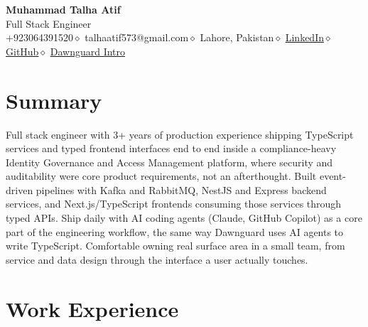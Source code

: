 \documentclass[10pt, letterpaper]{article}
\begin{document}
\pagestyle{empty}

\begin{center}
  {\Large\bfseries\color{navy} Muhammad Talha Atif}\\[4pt]
  {\normalsize\color{medgray} Full Stack Engineer}\\[4pt]
  {\small\color{lightgray}
    +923064391520\enspace$\diamond$\enspace
    talhaatif573@gmail.com\enspace$\diamond$\enspace
    Lahore, Pakistan\enspace$\diamond$\enspace
    \href{https://linkedin.com/in/muhammad-talha-atif}{LinkedIn}\enspace$\diamond$\enspace
    \href{https://github.com/M-Talha-Atif}{GitHub}\enspace$\diamond$\enspace
    \href{https://talha-atif.vercel.app/r/dawnguard}{Dawnguard Intro}}
\end{center}

\vspace{2pt}

\section{Summary}

Full stack engineer with 3+ years of production experience shipping TypeScript services and
typed frontend interfaces end to end inside a compliance-heavy Identity Governance and Access
Management platform, where security and auditability were core product requirements, not an
afterthought. Built event-driven pipelines with Kafka and RabbitMQ, NestJS and Express backend
services, and Next.js/TypeScript frontends consuming those services through typed APIs. Ship
daily with AI coding agents (Claude, GitHub Copilot) as a core part of the engineering workflow,
the same way Dawnguard uses AI agents to write TypeScript. Comfortable owning real surface area
in a small team, from service and data design through the interface a user actually touches.

\section{Work Experience}
\end{document}
